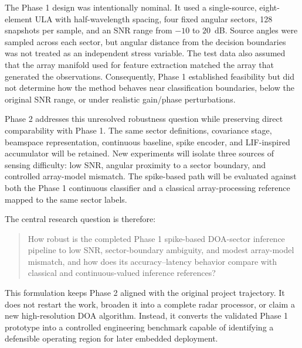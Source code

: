 The Phase 1 design was intentionally nominal. It used a single-source, eight-element ULA with half-wavelength spacing, four fixed angular sectors, 128 snapshots per sample, and an SNR range from $-10$ to $20$~dB. Source angles were sampled across each sector, but angular distance from the decision boundaries was not treated as an independent stress variable. The test data also assumed that the array manifold used for feature extraction matched the array that generated the observations. Consequently, Phase 1 established feasibility but did not determine how the method behaves near classification boundaries, below the original SNR range, or under realistic gain/phase perturbations.

Phase 2 addresses this unresolved robustness question while preserving direct comparability with Phase 1. The same sector definitions, covariance stage, beamspace representation, continuous baseline, spike encoder, and LIF-inspired accumulator will be retained. New experiments will isolate three sources of sensing difficulty: low SNR, angular proximity to a sector boundary, and controlled array-model mismatch. The spike-based path will be evaluated against both the Phase 1 continuous classifier and a classical array-processing reference mapped to the same sector labels.

The central research question is therefore:

\begin{quote}
How robust is the completed Phase 1 spike-based DOA-sector inference pipeline to low SNR, sector-boundary ambiguity, and modest array-model mismatch, and how does its accuracy--latency behavior compare with classical and continuous-valued inference references?
\end{quote}

This formulation keeps Phase 2 aligned with the original project trajectory. It does not restart the work, broaden it into a complete radar processor, or claim a new high-resolution DOA algorithm. Instead, it converts the validated Phase 1 prototype into a controlled engineering benchmark capable of identifying a defensible operating region for later embedded deployment.